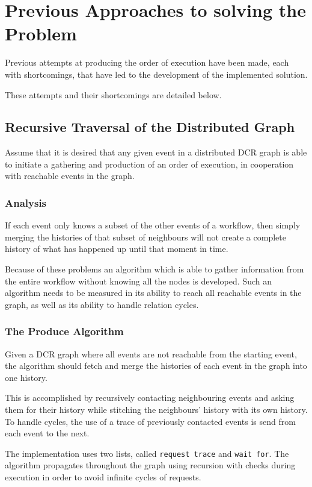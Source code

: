 \chapter{Previous Approaches to solving the Problem}
\label{chap:previous-attempts}
	Previous attempts at producing the order of execution have been made, each with shortcomings, that have led to the development of the implemented solution.
	
	\newpar These attempts and their shortcomings are detailed below.
	
	\section{Recursive Traversal of the Distributed Graph}
	Assume that it is desired that any given event in a distributed DCR graph is able to initiate a gathering and production of an order of execution, in cooperation with reachable events in the graph. 
	
	\subsection{Analysis}
	If each event only knows a subset of the other events of a workflow, then simply merging the histories of that subset of neighbours will not create a complete history of what has happened up until that moment in time. 
	
	Because of these problems an algorithm which is able to gather information from the entire workflow without knowing all the nodes is developed. Such an algorithm needs to be measured in its ability to reach all reachable events in the graph, as well as its ability to handle relation cycles. 
	
	\subsection{The Produce Algorithm}
	Given a DCR graph where all events are not reachable from the starting event, the algorithm should fetch and merge the histories of each event in the graph into one history.
	
	This is accomplished by recursively contacting neighbouring events and asking them for their history while stitching the neighbours' history with its own history. To handle cycles, the use of a trace of previously contacted events is send from each event to the next.
	
	\newpar The implementation uses two lists, called \texttt{request trace} and \texttt{wait for}.
	The algorithm propagates throughout the graph using recursion with checks during execution in order to avoid infinite cycles of requests. 
	
